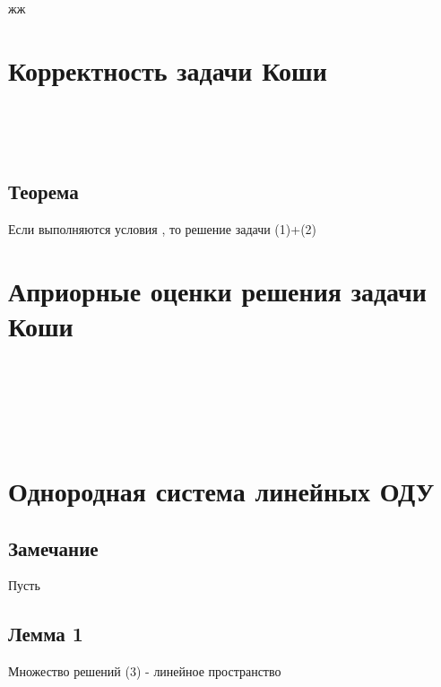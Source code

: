 \documentclass[
]{article}
\begin{document}
{жж}

\section{Корректность задачи
Коши}\label{ux43aux43eux440ux440ux435ux43aux442ux43dux43eux441ux442ux44c-ux437ux430ux434ux430ux447ux438-ux43aux43eux448ux438}

{}\strut \\
{}\strut \\
{}

\subsection{Теорема}\label{ux442ux435ux43eux440ux435ux43cux430}

Если выполняются условия {}, то {} решение задачи (1)+(2)

\section{Априорные оценки решения задачи
Коши}\label{ux430ux43fux440ux438ux43eux440ux43dux44bux435-ux43eux446ux435ux43dux43aux438-ux440ux435ux448ux435ux43dux438ux44f-ux437ux430ux434ux430ux447ux438-ux43aux43eux448ux438}

{}\strut \\
{}\strut \\
{}\strut \\
{}

\section{Однородная система линейных
ОДУ}\label{ux43eux434ux43dux43eux440ux43eux434ux43dux430ux44f-ux441ux438ux441ux442ux435ux43cux430-ux43bux438ux43dux435ux439ux43dux44bux445-ux43eux434ux443}

{}

\subsection{Замечание}\label{ux437ux430ux43cux435ux447ux430ux43dux438ux435}

Пусть

\subsection{Лемма 1}\label{ux43bux435ux43cux43cux430-1}

Множество решений (3) - линейное пространство

{}
\end{document}
